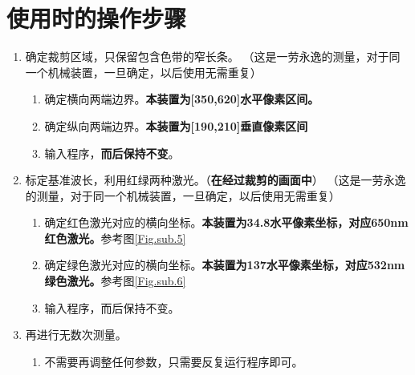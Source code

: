 \documentclass[UTF8]{ctexart}
\begin{document}
\section{使用时的操作步骤}
\begin{enumerate}
    \item 确定裁剪区域，只保留包含色带的窄长条。
（这是一劳永逸的测量，对于同一个机械装置，一旦确定，以后使用无需重复）
    \begin{enumerate}
        \item 确定横向两端边界。\textbf{本装置为[350,620]水平像素区间。}
        \item 确定纵向两端边界。\textbf{本装置为[190,210]垂直像素区间}
        \item 输入程序，\textbf{而后保持不变}。
    \end{enumerate}
    \item 标定基准波长，利用红绿两种激光。（\textbf{在经过裁剪的画面中}）
    （这是一劳永逸的测量，对于同一个机械装置，一旦确定，以后使用无需重复）
    \begin{enumerate}
        \item 确定红色激光对应的横向坐标。\textbf{本装置为34.8水平像素坐标，对应650nm红色激光。}参考图\ref{Fig.sub.5}
        \item 确定绿色激光对应的横向坐标。\textbf{本装置为137水平像素坐标，对应532nm绿色激光。}参考图\ref{Fig.sub.6}
        \item 输入程序，而后保持不变。
    \end{enumerate}
    \item 再进行无数次测量。
    \begin{enumerate}
        \item 不需要再调整任何参数，只需要反复运行程序即可。
    \end{enumerate}


\end{enumerate}
\end{document}
